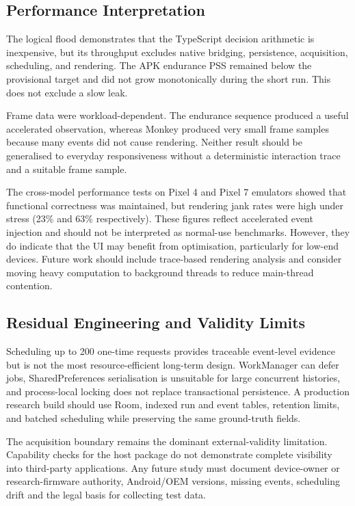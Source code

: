 \subsection{Performance Interpretation}

The logical flood demonstrates that the TypeScript decision arithmetic is inexpensive, but its throughput excludes native bridging, persistence, acquisition, scheduling, and rendering. The APK endurance PSS remained below the provisional target and did not grow monotonically during the short run. This does not exclude a slow leak.

Frame data were workload-dependent. The endurance sequence produced a useful accelerated observation, whereas Monkey produced very small frame samples because many events did not cause rendering. Neither result should be generalised to everyday responsiveness without a deterministic interaction trace and a suitable frame sample.

The cross-model performance tests on Pixel 4 and Pixel 7 emulators showed that functional correctness was maintained, but rendering jank rates were high under stress (23\% and 63\% respectively). These figures reflect accelerated event injection and should not be interpreted as normal-use benchmarks. However, they do indicate that the UI may benefit from optimisation, particularly for low-end devices. Future work should include trace-based rendering analysis and consider moving heavy computation to background threads to reduce main-thread contention.

\subsection{Residual Engineering and Validity Limits}

Scheduling up to 200 one-time requests provides traceable event-level evidence but is not the most resource-efficient long-term design. WorkManager can defer jobs, SharedPreferences serialisation is unsuitable for large concurrent histories, and process-local locking does not replace transactional persistence. A production research build should use Room, indexed run and event tables, retention limits, and batched scheduling while preserving the same ground-truth fields.

The acquisition boundary remains the dominant external-validity limitation. Capability checks for the host package do not demonstrate complete visibility into third-party applications. Any future study must document device-owner or research-firmware authority, Android/OEM versions, missing events, scheduling drift and the legal basis for collecting test data.

